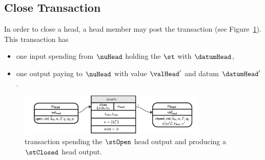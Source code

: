\subsection{Close Transaction}\label{sec:close-tx}

In order to close a head, a head member may post the \mtxClose{} transaction
(see Figure~\ref{fig:closeTx}). This transaction has
\begin{itemize}
	\item one input spending from $\nuHead$ holding the $\st$ with $\datumHead$,
	\item one output paying to $\nuHead$ with value $\valHead'$ and
	      datum $\datumHead'$.
\end{itemize}

\begin{figure}
	\centering
        \includegraphics[width=0.8\textwidth]{Hydra/Protocol/Figures/closeTx.pdf}
	\caption{\mtxClose{} transaction spending the $\stOpen$ head output and producing a $\stClosed$ head output.}\label{fig:closeTx}
\end{figure}


